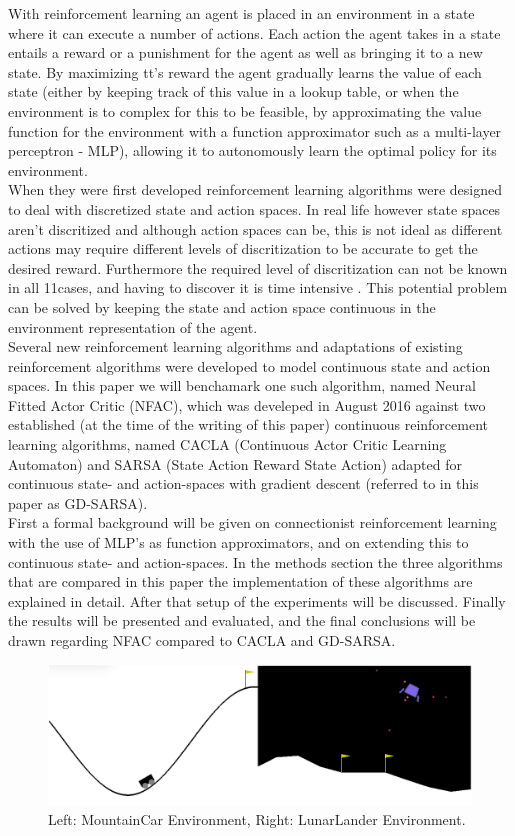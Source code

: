 With reinforcement learning an agent is placed in an environment in a state where it can execute a number of actions. Each
action the agent takes in a state entails a reward or a punishment for the agent as well as bringing it to a new state.
By maximizing tt's reward the agent gradually learns the value of each state (either by keeping track of this value in a
lookup table, or when the environment is to complex for this to be feasible, by approximating the value function for the
environment with a function approximator such as a multi-layer perceptron - MLP), allowing it to autonomously learn the optimal policy
for its environment. \\
When they were first developed reinforcement learning algorithms were designed to deal with discretized state and action
spaces. In real life however state spaces aren't discritized and although action spaces can be, this is not ideal as different
actions may require different levels of discritization to be accurate to get the desired reward. Furthermore the required level
of discritization can not be known in all 11cases, and having to discover it is time intensive \cite{van2007reinforcement}. %
This potential problem can be solved by keeping the state and action space continuous in the environment representation of the agent. \\
Several new reinforcement learning algorithms and adaptations of existing reinforcement algorithms were developed to model continuous
state and action spaces. In this paper we will benchamark one such algorithm, named Neural Fitted Actor Critic (NFAC), which was develeped in August 2016 \cite{zimmer2016neural}
against two established (at the time of the writing of this paper) continuous reinforcement learning algorithms, named CACLA (Continuous Actor Critic Learning Automaton)
\cite{van2007reinforcement}
and SARSA (State Action Reward State Action) adapted for continuous state- and action-spaces \cite{nichols2014application} with gradient descent (referred to in this paper as GD-SARSA). \\
First a formal background will be given on connectionist reinforcement learning with the use of MLP's as function approximators,
and on extending this to continuous state- and action-spaces. In the methods section the three algorithms that are compared
 in this paper the implementation of these algorithms are explained in detail. After that setup of the experiments will be discussed.
Finally the results will be presented and evaluated, and the final conclusions will be drawn regarding NFAC compared to CACLA and GD-SARSA.

\begin{figure}[t]
 \centering 
    \includegraphics[width = 0.7\columnwidth]{figs/mountainlunar.png}
 \caption{Left: MountainCar Environment, Right: LunarLander Environment.}
\label{fig:mountainlunar}
\end{figure}
